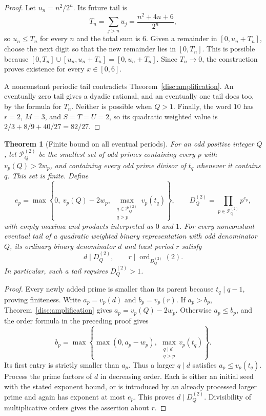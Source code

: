 \documentclass[11pt,a4paper]{article}
\newtheorem{theorem}{Theorem}[section]
\theoremstyle{definition}
\theoremstyle{remark}
\numberwithin{equation}{section}
\begin{document}
\begin{proof}
Let $u_n=n^2/2^n$.  Its future tail is
\[
 T_n=\sum_{j>n}u_j=\frac{n^2+4n+6}{2^n},
\]
so $u_n\le T_n$ for every $n$ and the total sum is $6$.
Given a remainder in $[0,u_n+T_n]$, choose the next digit so that the
new remainder lies in $[0,T_n]$.  This is possible because
$[0,T_n]\cup[u_n,u_n+T_n]=[0,u_n+T_n]$.  Since $T_n\to0$, the
construction proves existence for every $x\in[0,6]$.

A nonconstant periodic tail contradicts
Theorem~\ref{disc:amplification}.  An eventually zero tail gives a
dyadic rational, and an eventually one tail does too, by the formula
for $T_n$.  Neither is possible when $Q>1$.  Finally, the word $10$
has $r=2$, $M=3$, and $S=T=U=2$, so its quadratic weighted value is
$2/3+8/9+40/27=82/27$.
\end{proof}

\begin{theorem}[Finite bound on all eventual periods]
\label{disc:periodbound}
For an odd positive integer $Q$, let $\mathcal P_Q^{(2)}$ be the
smallest set of odd primes containing every $p$ with
$v_p(Q)>2w_p$, and containing every odd prime divisor of $t_q$
whenever it contains $q$.  This set is finite.  Define
\[
 e_p=\max\left\{0,\ v_p(Q)-2w_p,\
       \max_{\substack{q\in\mathcal P_Q^{(2)}\\q>p}}v_p(t_q)\right\},
 \qquad D_Q^{(2)}=\prod_{p\in\mathcal P_Q^{(2)}}p^{e_p},
\]
with empty maxima and products interpreted as $0$ and $1$.
For every nonconstant eventual tail of a quadratic weighted binary
representation with odd denominator $Q$, its ordinary binary
denominator $d$ and least period $r$ satisfy
\[
 d\mid D_Q^{(2)},\qquad
 r\mid\operatorname{ord}_{D_Q^{(2)}}(2).
\]
In particular, such a tail requires $D_Q^{(2)}>1$.
\end{theorem}

\begin{proof}
Every newly added prime is smaller than its parent because
$t_q\mid q-1$, proving finiteness.  Write $a_p=v_p(d)$ and
$b_p=v_p(r)$.  If $a_p>b_p$, Theorem~\ref{disc:amplification}
gives $a_p=v_p(Q)-2w_p$.  Otherwise $a_p\le b_p$, and the order
formula in the preceding proof gives
\[
 b_p=\max\left\{\max(0,a_p-w_p),\
          \max_{\substack{q\mid d\\q>p}}v_p(t_q)\right\}.
\]
Its first entry is strictly smaller than $a_p$.  Thus a larger
$q\mid d$ satisfies $a_p\le v_p(t_q)$.  Process the prime factors
of $d$ in decreasing order.  Each is either an initial seed with the
stated exponent bound, or is introduced by an already processed
larger prime and again has exponent at most $e_p$.  This proves
$d\mid D_Q^{(2)}$.  Divisibility of multiplicative orders gives
the assertion about $r$.
\end{proof}
\end{document}
